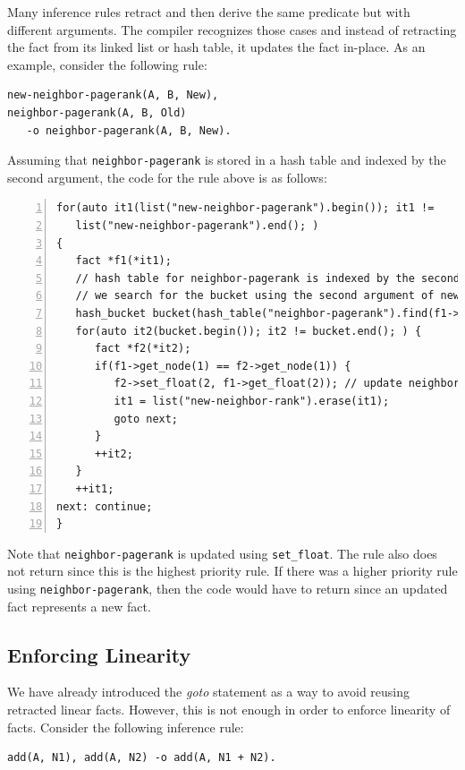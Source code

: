Many inference rules retract and then derive the same predicate but with
different arguments. The compiler recognizes those cases and instead of
retracting the fact from its linked list or hash table, it updates the fact
in-place. As an example, consider the following rule:

\begin{Verbatim}[fontsize=\scriptsize]
new-neighbor-pagerank(A, B, New),
neighbor-pagerank(A, B, Old)
   -o neighbor-pagerank(A, B, New).
\end{Verbatim}

Assuming that \texttt{neighbor-pagerank} is stored in a hash table and indexed
by the second argument, the code for the rule above is as follows:

\begin{Verbatim}[numbers=left,fontsize=\scriptsize,xleftmargin=\codemargin]
for(auto it1(list("new-neighbor-pagerank").begin()); it1 !=
   list("new-neighbor-pagerank").end(); )
{
   fact *f1(*it1);
   // hash table for neighbor-pagerank is indexed by the second argument therefore
   // we search for the bucket using the second argument of new-neighbor-pagerank
   hash_bucket bucket(hash_table("neighbor-pagerank").find(f1->get_node(1));
   for(auto it2(bucket.begin()); it2 != bucket.end(); ) {
      fact *f2(*it2);
      if(f1->get_node(1) == f2->get_node(1)) {
         f2->set_float(2, f1->get_float(2)); // update neighbor-pagerank
         it1 = list("new-neighbor-rank").erase(it1);
         goto next;
      }
      ++it2;
   }
   ++it1;
next: continue;
}
\end{Verbatim}

Note that \texttt{neighbor-pagerank} is updated using \texttt{set\_float}. The
rule also does not return since this is the highest priority rule. If there
was a higher priority rule using \texttt{neighbor-pagerank}, then the code
would have to return since an updated fact represents a new fact.

\subsection{Enforcing Linearity}

We have already introduced the \emph{goto} statement as a way to avoid reusing
retracted linear facts. However, this is not enough in order to enforce
linearity of facts. Consider the following inference rule:

\begin{Verbatim}[fontsize=\scriptsize]
add(A, N1), add(A, N2) -o add(A, N1 + N2).
\end{Verbatim}

